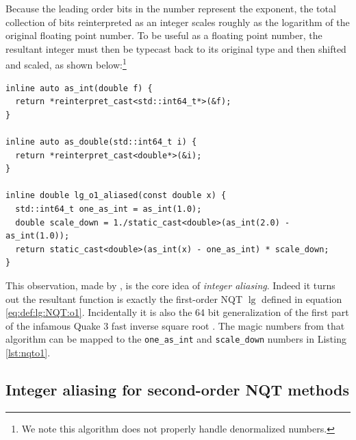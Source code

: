 \documentclass[linenumbers,twocolumn]{aastex631}
\begin{document}
Because the leading order bits in the number represent the exponent, the total collection of bits reinterpreted as an integer scales roughly as the logarithm of the original floating point number. To be useful as a floating point number, the resultant integer must then be typecast back to its original type and then shifted and scaled, as shown below:\footnote{We note this algorithm does not properly handle denormalized numbers.}
\begin{nolinenumbers}
\begin{lstlisting}[caption={The basic integer-aliased NQTo1 log}, label={lst:nqto1}]
inline auto as_int(double f) {
  return *reinterpret_cast<std::int64_t*>(&f);
}

inline auto as_double(std::int64_t i) {
  return *reinterpret_cast<double*>(&i);
}

inline double lg_o1_aliased(const double x) {
  std::int64_t one_as_int = as_int(1.0);
  double scale_down = 1./static_cast<double>(as_int(2.0) - as_int(1.0));
  return static_cast<double>(as_int(x) - one_as_int) * scale_down;
}
\end{lstlisting}
\end{nolinenumbers}
This observation, made by \citet{Blinn}, is the core idea of \textit{integer aliasing}. Indeed it turns out the resultant function is exactly the first-order NQT $\lg$ defined in equation \eqref{eq:def:lg:NQT:o1}. Incidentally it is also the 64 bit generalization of the first part of the infamous Quake 3 fast inverse square root \citep{fastinvqrt,WizardryOfId}. The magic numbers from that algorithm can be mapped to the {\tt one\_as\_int} and {\tt scale\_down} numbers in Listing \ref{lst:nqto1}.

\subsection{Integer aliasing for second-order NQT methods}
\label{sec:aliasing:NQT:o2}
\end{document}
